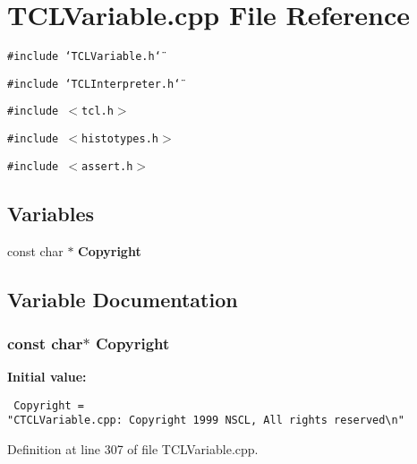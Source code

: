 \section{TCLVariable.cpp File Reference}
\label{TCLVariable_8cpp}
{\tt \#include \char`\"{}TCLVariable.h\char`\"{}}\par
{\tt \#include \char`\"{}TCLInterpreter.h\char`\"{}}\par
{\tt \#include $<$tcl.h$>$}\par
{\tt \#include $<$histotypes.h$>$}\par
{\tt \#include $<$assert.h$>$}\par
\subsection*{Variables}
\begin{CompactItemize}
\item 
const char $\ast$ {\bf Copyright}
\end{CompactItemize}


\subsection{Variable Documentation}
\subsubsection{\setlength{\rightskip}{0pt plus 5cm}const char$\ast$ Copyright\hspace{0.3cm}{\tt  [static]}}\label{TCLVariable_8cpp_a0}


{\bf Initial value:}

\footnotesize\begin{verbatim} Copyright = 
"CTCLVariable.cpp: Copyright 1999 NSCL, All rights reserved\n"\end{verbatim}\normalsize 


Definition at line 307 of file TCLVariable.cpp.